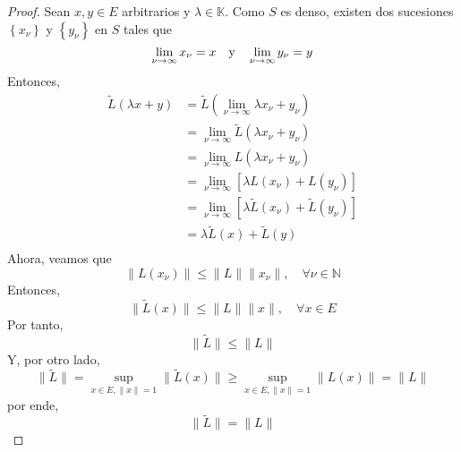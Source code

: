 \documentclass[12pt]{report}
\newcounter{it}
\theoremstyle{largebreak}
\renewcommand{\leq}{\ensuremath{\leqslant}}
\renewcommand{\geq}{\ensuremath{\geqslant}}
\newcommand\norm[1]{\ensuremath{\|#1\|}}
\begin{document}
    \begin{proof}
        Sean $x,y\in E$ arbitrarios y $\lambda\in\mathbb{K}$. Como $S$ es denso, existen dos sucesiones $\left\{x_\nu\right\}$ y $\left\{y_\nu\right\}$ en $S$ tales que
        \begin{equation*}
            \lim_{\nu\rightarrow\infty}x_\nu=x\quad\textup{y}\quad\lim_{\nu\rightarrow\infty}y_\nu=y
        \end{equation*}
        Entonces,
        \begin{equation*}
            \begin{split}
                \tilde{L}(\lambda x+y)&=\tilde{L}\left(\lim_{\nu\rightarrow\infty}\lambda x_\nu+y_\nu \right)\\
                &=\lim_{\nu\rightarrow\infty}\tilde{L}\left(\lambda x_\nu+y_\nu \right)\\
                &=\lim_{\nu\rightarrow\infty}L\left(\lambda x_\nu+y_\nu \right)\\
                &=\lim_{\nu\rightarrow\infty}\left[\lambda L(x_\nu)+L(y_\nu)\right]\\
                &=\lim_{\nu\rightarrow\infty}\left[\lambda\tilde{L}(x_\nu)+\tilde{L}(y_\nu)\right]\\
                &=\lambda\tilde{L}(x)+\tilde{L}(y)\\
            \end{split}
        \end{equation*}
        Ahora, veamos que
        \begin{equation*}
            \norm{L(x_\nu)}\leq\norm{L}\norm{x_\nu},\quad\forall \nu\in\mathbb{N}
        \end{equation*}
        Entonces,
        \begin{equation*}
            \norm{\tilde{L}(x)}\leq\norm{L}\norm{x},\quad\forall x\in E
        \end{equation*}
        Por tanto,
        \begin{equation*}
            \norm{\tilde{L}}\leq\norm{L}
        \end{equation*}
        Y, por otro lado,
        \begin{equation*}
            \norm{\tilde{L}}=\sup_{x\in E,\norm{x}=1}\norm{\tilde{L}(x)}\geq\sup_{ x\in E,\norm{x}=1}\norm{L(x)}=\norm{L}
        \end{equation*}
        por ende,
        \begin{equation*}
            \norm{\tilde{L}}=\norm{L}
        \end{equation*}
    \end{proof}
\end{document}

